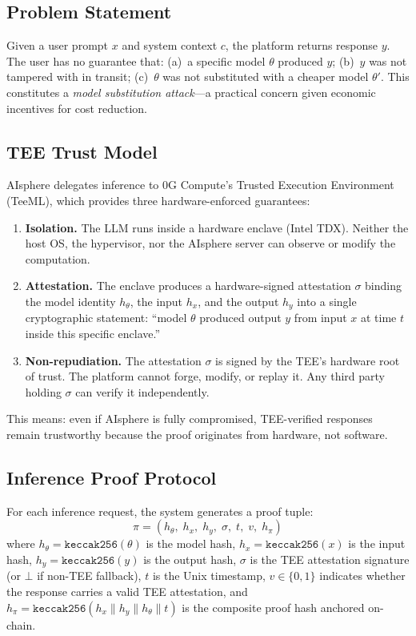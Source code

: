 \documentclass[10pt,a4paper]{article}
\theoremstyle{definition}
\theoremstyle{plain}
\begin{document}
\subsection{Problem Statement}

Given a user prompt $x$ and system context $c$, the platform returns response $y$. The user has no guarantee that: (a)~a specific model $\theta$ produced $y$; (b)~$y$ was not tampered with in transit; (c)~$\theta$ was not substituted with a cheaper model $\theta'$. This constitutes a \emph{model substitution attack}---a practical concern given economic incentives for cost reduction.

\subsection{TEE Trust Model}

AIsphere delegates inference to 0G Compute's Trusted Execution Environment (TeeML), which provides three hardware-enforced guarantees:

\begin{enumerate}[leftmargin=1.8em, itemsep=2pt, parsep=0pt]
  \item \textbf{Isolation.} The LLM runs inside a hardware enclave (Intel TDX). Neither the host OS, the hypervisor, nor the AIsphere server can observe or modify the computation.
  \item \textbf{Attestation.} The enclave produces a hardware-signed attestation $\sigma$ binding the model identity $h_\theta$, the input $h_x$, and the output $h_y$ into a single cryptographic statement: ``model $\theta$ produced output $y$ from input $x$ at time $t$ inside this specific enclave.''
  \item \textbf{Non-repudiation.} The attestation $\sigma$ is signed by the TEE's hardware root of trust. The platform cannot forge, modify, or replay it. Any third party holding $\sigma$ can verify it independently.
\end{enumerate}

This means: even if AIsphere is fully compromised, TEE-verified responses remain trustworthy because the proof originates from hardware, not software.

\subsection{Inference Proof Protocol}

\begin{defbox}
For each inference request, the system generates a proof tuple:
$$\pi = (h_\theta,\; h_x,\; h_y,\; \sigma,\; t,\; v,\; h_\pi)$$
where $h_\theta = \texttt{keccak256}(\theta)$ is the model hash, $h_x = \texttt{keccak256}(x)$ is the input hash, $h_y = \texttt{keccak256}(y)$ is the output hash, $\sigma$ is the TEE attestation signature (or $\bot$ if non-TEE fallback), $t$ is the Unix timestamp, $v \in \{0,1\}$ indicates whether the response carries a valid TEE attestation, and $h_\pi = \texttt{keccak256}(h_x \| h_y \| h_\theta \| t)$ is the composite proof hash anchored on-chain.
\end{defbox}
\end{document}
